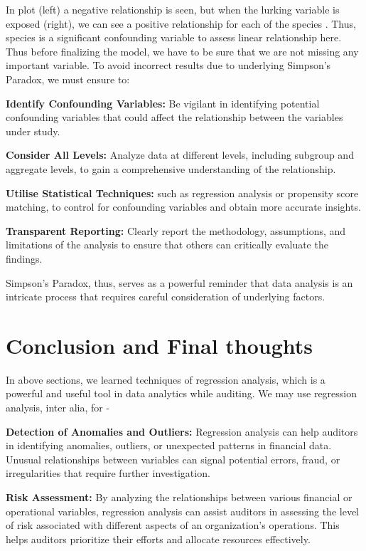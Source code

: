 \documentclass[
]{book}
\begin{document}
In plot (left) a negative relationship is seen, but when the lurking variable is exposed (right), we can see a positive relationship for each of the species . Thus, species is a significant confounding variable to assess linear relationship here. Thus before finalizing the model, we have to be sure that we are not missing any important variable. To avoid incorrect results due to underlying Simpson's Paradox, we must ensure to:

\textbf{Identify Confounding Variables:} Be vigilant in identifying potential confounding variables that could affect the relationship between the variables under study.

\textbf{Consider All Levels:} Analyze data at different levels, including subgroup and aggregate levels, to gain a comprehensive understanding of the relationship.

\textbf{Utilise Statistical Techniques:} such as regression analysis or propensity score matching, to control for confounding variables and obtain more accurate insights.

\textbf{Transparent Reporting:} Clearly report the methodology, assumptions, and limitations of the analysis to ensure that others can critically evaluate the findings.

Simpson's Paradox, thus, serves as a powerful reminder that data analysis is an intricate process that requires careful consideration of underlying factors.

\hypertarget{conclusion-and-final-thoughts}{%
\section{Conclusion and Final thoughts}\label{conclusion-and-final-thoughts}}

In above sections, we learned techniques of regression analysis, which is a powerful and useful tool in data analytics while auditing. We may use regression analysis, inter alia, for -

\textbf{Detection of Anomalies and Outliers:} Regression analysis can help auditors in identifying anomalies, outliers, or unexpected patterns in financial data. Unusual relationships between variables can signal potential errors, fraud, or irregularities that require further investigation.

\textbf{Risk Assessment:} By analyzing the relationships between various financial or operational variables, regression analysis can assist auditors in assessing the level of risk associated with different aspects of an organization's operations. This helps auditors prioritize their efforts and allocate resources effectively.
\end{document}

